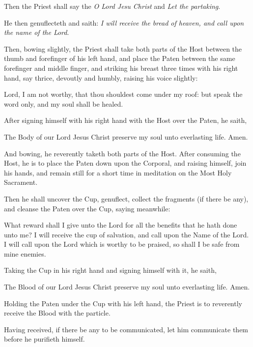 \begin{multicols}{2}
\begin{rubric}
    Then the Priest shall say the \emph{O Lord Jesu Christ} and \emph{Let the partaking}.
\end{rubric}
\begin{rubric}
    He then genuflecteth and saith: \emph{I will receive the bread of heaven, and call upon the name of the Lord}.
\end{rubric}
\begin{rubric}
    Then, bowing slightly, the Priest shall take both parts of the Host between the thumb and forefinger of his left hand, and place the Paten between the same forefinger and middle finger, and striking his breast three times with his right hand, say thrice, devoutly and humbly, raising his voice slightly:
\end{rubric}\par\noindent
    Lord, I am not worthy,  that thou shouldest come under my roof: but speak the word only, and my soul shall be healed.
\begin{rubric}
After signing himself with his right hand with the Host over the Paten, he saith,
\end{rubric}\par\noindent
The Body of our Lord Jesus Christ preserve my soul unto everlasting life. Amen.
\begin{rubric}
And bowing, he reverently taketh both parts of the Host. After consuming the Host, he is to place the Paten down upon the Corporal, and raising himself, join his hands, and remain still for a short time in meditation on the Most Holy Sacrament.
\end{rubric}
\begin{rubric}
	Then he shall uncover the Cup, genuflect, collect the fragments (if there be any), and cleanse the Paten over the Cup, saying meanwhile:
\end{rubric}
\par\noindent
What reward shall I give unto the Lord for all the benefits that he hath done unto me? I will receive the cup of salvation, and call upon the Name of the Lord. I will call upon the Lord which is worthy to be praised, so shall I be safe from mine enemies.
\begin{rubric}
    Taking the Cup in his right hand and signing himself with it, he saith,
\end{rubric}\par\noindent
The Blood of our Lord Jesus Christ preserve my soul unto everlasting life. Amen.
\begin{rubric}
    Holding the Paten under the Cup with his left hand, the Priest is to reverently receive the Blood with the particle.
\end{rubric}
\begin{rubric}
	Having received, if there be any to be communicated, let him communicate them before he purifieth himself.
\end{rubric}
\end{multicols}
